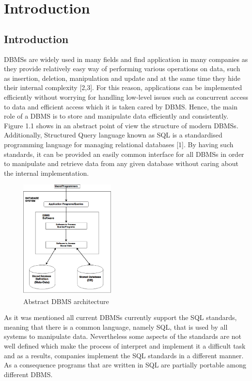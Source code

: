 \chapter{Introduction}
 \section{Introduction}


DBMSs are widely used in many fields and find application in many companies as they provide relatively easy way of performing various operations on data, such as insertion, deletion, manipulation and update and at the same time they hide their internal complexity [2,3]. For this reason, applications can be implemented efficiently without worrying for handling low-level issues  such as concurrent access to data and efficient access which it is taken cared by DBMS. Hence, the main role of a DBMS is to store and manipulate data efficiently and consistently. Figure 1.1 shows in an abstract point of view the structure of modern DBMSs. Additionally, Structured Query language known as SQL is a standardised programming language for managing relational databases [1]. By having such standards, it can be provided an easily common interface for all DBMSs in order to manipulate and retrieve data from any given database without caring about the internal implementation. 


 \begin{figure} 
      \centering
      \includegraphics[width=\textwidth,height=6cm]{Images/Chapter1/db_arch}
      \caption{Abstract DBMS architecture}
      \label{fig:counting-methods}
    \end{figure}

  
As it was mentioned all current DBMSs currently support the SQL standards, meaning that there is a common language, namely SQL, that is used by all systems to manipulate data. Nevertheless some aspects of the standards are not well defined which make the process of interpret and implement it a difficult task and as a results, companies implement the SQL standards in a different manner. As a consequence programs that are written in SQL are partially portable among different DBMS.  

